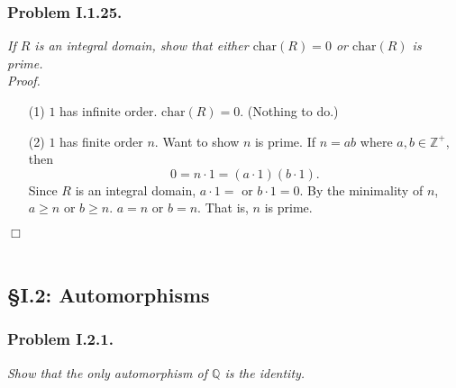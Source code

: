 \documentclass{article}
\begin{document}



\subsubsection*{Problem I.1.25.}
\emph{If $R$ is an integral domain, show that either
$\text{char}(R) = 0$ or $\text{char}(R)$ is prime.} \\

\emph{Proof.}
\begin{enumerate}
\item[(1)]
  $1$ has infinite order. $\text{char}(R) = 0$. (Nothing to do.)
\item[(2)]
  $1$ has finite order $n$.
  Want to show $n$ is prime.
  If $n = ab$ where $a, b \in \mathbb{Z}^+$,
  then $$0 = n \cdot 1 = (a \cdot 1)(b \cdot 1).$$
  Since $R$ is an integral domain, $a \cdot 1 = $ or $b \cdot 1 = 0$.
  By the minimality of $n$, $a \geq n$ or $b \geq n$.
  $a = n$ or $b = n$. That is, $n$ is prime.
\end{enumerate}
$\Box$ \\\\






\subsection*{\S I.2: Automorphisms \\}



\subsubsection*{Problem I.2.1.}
\emph{Show that the only automorphism of $\mathbb{Q}$ is the identity.} \\
\end{document}
